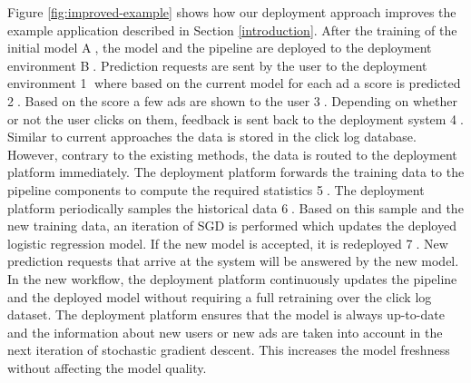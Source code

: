 Figure \ref{fig:improved-example} shows how our deployment approach improves the example application described in Section \ref{introduction}.
After the training of the initial model \textcircled{A}, the model and the pipeline are deployed to the deployment environment \textcircled{B}.
Prediction requests are sent by the user to the deployment environment \textcircled{1} where based on the current model for each ad a score is predicted \textcircled{2}.
Based on the score a few ads are shown to the user \textcircled{3}.
Depending on whether or not the user clicks on them, feedback is sent back to the deployment system \textcircled{4}.
Similar to current approaches the data is stored in the click log database.
However, contrary to the existing methods, the data is routed to the deployment platform immediately.
The deployment platform forwards the training data to the pipeline components to compute the required statistics \textcircled{5}.
The deployment platform periodically samples the historical data \textcircled{6}.
Based on this sample and the new training data, an iteration of SGD is performed which updates the deployed logistic regression model.
If the new model is accepted, it is redeployed \textcircled{7}.
New prediction requests that arrive at the system will be answered by the new model.
In the new workflow, the deployment platform continuously updates the pipeline and the deployed model without requiring a full retraining over the click log dataset.
The deployment platform ensures that the model is always up-to-date and the information about new users or new ads are taken into account in the next iteration of stochastic gradient descent.
This increases the model freshness without affecting the model quality.